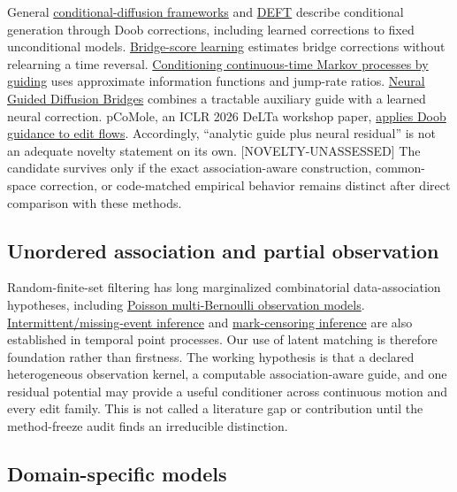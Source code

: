\documentclass[11pt]{article}
\newcommand{\status}[1]{%
  \textcolor{statusred}{\textbf{\texttt{[#1]}}}%
}
\def\status#1{[#1]}%
\begin{document}
General \href{https://openreview.net/forum?id=k2PA7CUUJH}{conditional-diffusion frameworks} and \href{https://proceedings.neurips.cc/paper_files/paper/2024/hash/22d258dfbdf840ccbf266bbc545dd95f-Abstract-Conference.html}{DEFT} describe conditional generation through Doob corrections, including learned corrections to fixed unconditional models. \href{https://proceedings.mlr.press/v258/baker25a.html}{Bridge-score learning} estimates bridge corrections without relearning a time reversal. \href{https://doi.org/10.1080/17442508.2022.2150081}{Conditioning continuous-time Markov processes by guiding} uses approximate information functions and jump-rate ratios. \href{https://proceedings.mlr.press/v267/yang25af.html}{Neural Guided Diffusion Bridges} combines a tractable auxiliary guide with a learned neural correction. pCoMole, an ICLR 2026 DeLTa workshop paper, \href{https://openreview.net/forum?id=tTILzscPs4}{applies Doob guidance to edit flows}. Accordingly, ``analytic guide plus neural residual'' is not an adequate novelty statement on its own. \status{NOVELTY-UNASSESSED} The candidate survives only if the exact association-aware construction, common-space correction, or code-matched empirical behavior remains distinct after direct comparison with these methods.

\subsection{Unordered association and partial observation}
\label{sec:unordered-association-and-partial-observation}

Random-finite-set filtering has long marginalized combinatorial data-association hypotheses, including \href{https://doi.org/10.1109/TAES.2019.2920220}{Poisson multi-Bernoulli observation models}. \href{https://proceedings.mlr.press/v130/gupta21a.html}{Intermittent/\allowbreak{}missing-event inference} and \href{https://proceedings.mlr.press/v216/boyd23a.html}{mark-censoring inference} are also established in temporal point processes. Our use of latent matching is therefore foundation rather than firstness. The working hypothesis is that a declared heterogeneous observation kernel, a computable association-aware guide, and one residual potential may provide a useful conditioner across continuous motion and every edit family. This is not called a literature gap or contribution until the method-freeze audit finds an irreducible distinction.

\subsection{Domain-specific models}
\label{sec:domain-specific-models}
\end{document}
